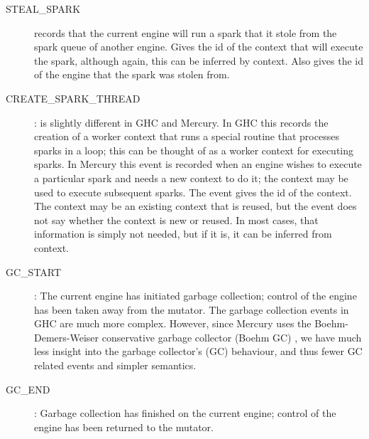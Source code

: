 \begin{description}
\item[STEAL\_SPARK]
records that the current engine will run a spark
that it stole from the spark queue of another engine.
Gives the id of the context that will execute the spark,
although again, this can be inferred by context.
Also gives the id of the engine that the spark was stolen from.

\item[CREATE\_SPARK\_THREAD]:
is slightly different in GHC and Mercury.
In GHC this records the creation of a worker context that runs a special
routine that processes sparks in a loop;
this can be thought of as a worker context for executing sparks.
In Mercury this event is recorded when an engine wishes to execute a particular
spark and needs a new context to do it;
the context may be used to execute subsequent sparks.
The event gives the id of the context.
The context may be an existing context that is reused,
but the event does not say whether the context is new or reused.
In most cases, that information is simply not needed,
but if it is, it can be inferred from context.

\item[GC\_START]:
The current engine has initiated garbage collection;
control of the engine has been taken away from the mutator.
The garbage collection events in GHC are much more complex.
However, since Mercury uses the
Boehm-Demers-Weiser conservative garbage collector (Boehm GC)
\citep{boehm:1988:gc},
we have much less insight into the garbage collector's (GC) behaviour,
and thus fewer GC related events and simpler semantics.

\item[GC\_END]:
Garbage collection has finished on the current engine;
control of the engine has been returned to the mutator.

\end{description}

